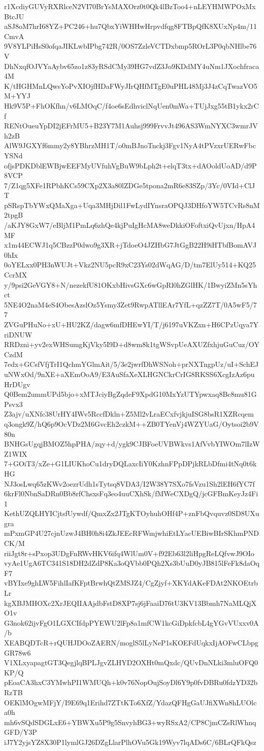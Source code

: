 r1XcdiyGUVyRXRlceN2VI70BrYsMAXOrz0t0Qk4lBzToo4+nLEYHMWPOxMxBtcJU
aSJ8oM7hrI68YZ+PC246+hu7QbxYiWHHwHrpvdfqg8FTBpQfK8XUxNp4m/11CmvA
9V8YLPiHsS0ofqaJIKLwbIPbg742R/0OS7ZzleVCTDxbmp5ROrL3P0qbNHlbe76V
DhNxqfOJVYaAybv65zo1z83yRSdCMy39HG7vdZ3Jo9KDdMY4uNm1JXochfraca4M
K/tHGHMnLQwsYoPvXIOjfHDaFWyJIrQHfMTgE0uPHL48Mj3J4zCqTwazVO5M+YYJ
Hk9V5P+FhOKfhn/v6LMOqC/f4oe6sEdhviclNqUen0mWa+TUjJxg55tB1ykx2rCf
RENtOueuYpDI2jEFrMU5+B23Y7M1Auhsj999FrvvJt496AS3WmNYXC3wmrJVh2zB
AlW9JGXYf6mmy2y8YBhrzMH1T/o0mBJnoTnckj3Fgv1NyA4tPVzxrUERwFbcYSNd
ofjsPDKDblEWBjwEEFMyUVfuhVgBuW9bLph2t+elqT3tx+dAOoldUoAD/d9P8VCP
7/Z1qg5XFe1RPbhKCs59CXp2X3a80lZDGe5tpona2mR6e83SZp/3Yc/0VId+ClJT
pSRspTbYWxQMaXga+Uqa3MHjDil1FwLydIYnsraOPQJ3DHfoYW5TCvRs8nM2tpgB
/aKJY8GxW7/eBljM1PmLq6zhQe4kjPuIgHcMA8weDkkiOFoftxiQvUjxn/HpA4MF
x1m44ECWJ1q5CBzzP0dwo9g3XR+jTdoeO4JZHbG7JtGgB22H9iHTbfBomAVJ0hIx
0oYELxx0PH3nWUJt+Vkz2NU5pcR9xC23Ys02dWqAG/D/tm7ElUy514+KQ25CcrMX
y/9psi2GeVGY8+N/nezekfU81OKxbHivsGXc6wGpRl0hZGlHK/1BwyiZMn5sYhct
5NE4O2naM4eS4ObesAzslOz5Ysmy3Zet9RwpATllEAr7YfL+qzZZ7T/0A5wF5/77
ZVGuPHuNo+xU+HU2KZ/dagw6mfDHEwYI/T/j6197uVKZxn+H6CPzUqya7YriDNUW
RRDzni+yv2exWHSumgKjVky5I9D+d8wm8k1tgWSvpUeAXUZfxhjuGuCuz/OYCzdM
7edx+GCsfVfjTrI1QchmYGlmAit/5/3e2jwrfDhWSNoh+prNXTngpUz/uI+SchEJ
uNWxOd/9nXE+aXEmOoA9/E3AuSfaXeXLHGNCkrCrIG8RKSS6XcgIzAz6puHrDUgv
Q0Bem2ummUPd5bjo+xMTJciyBgZqdeF9XpdG10MxYzUTYpwxaq8Bc8mu81GPsvx3
Z3ajv/uXNfc38UrHY4IWv5RccfDkln+Z5Ml2vLraECxfvjkjuISG8bsR1XZRcqem
q3ongk9Z/hQ6p9OcVDz2M6GvcEh2czkM++ZB0TYenVj4WZYUaG/Oytsoi2b9V80n
BNHGsUgqjBMOZ5hpPHA/zqy+d/ygk9CJBFoeUVBWkvs1AfVvbYIWOm7lIzWZ1WIX
7+GOiT3/xZe+G1LIUKhoCu1dryDQLaxcIiY0KzhnFPpDPjkRLbDfmi4tNq0t6kHG
NJ3osLwq65zKWv2oezrUdh1sTytsq8VDA3/I2W38Y7SXo7fsVzu1Sh2lEH6fYC7f
6krFl0NbnSaDRn0Bb8rfChsxsFq3eo4uuCXhSk/fMWeCXDgQ/jcGFBmKeyJz4Fi1
KethUZQLHYICjtsfUywdf/QmxZx2JTgKTOyhuhOHf4P+znFbQvquvz0SD8UXugra
mPxmGP4U27cjnUzwJ4BH0h8i4ZkJEEcRFWmjwhiEtLYacUEBiwBIrSKhmPNDCK/M
riiJgt8r+sPxop3UDgFnRWvHKV6ifq4WlUm0V+f92Eb63l2liHpgReLQfvwJ9OIo
vyAe1UgA6TC341S18DH2dZdP8Ka3oQVbb0PQh2Xs3bUuD0yJB815lFeFk8daOqF7
vBYIxe9ghLW5FihlIafKFptBrwhQtZMSJZ4/CgZjyf+XKYdAKeFDAt2NKOEtrbLr
kgXBJMHOXc2XrJEQIIAAjdbFstD8XP7sj6jFaaiD76tU3KV13Bbmh7NaMLQjXO1v
G3nok62ijvFgO1LGXCIfdpPYEWU2lFp8a1mfCW1kcGiDpkfcbL4gYGvVUxxv0A/b
XEABQDTcR+rQUHJDOoZAERN/moglS5lLyNeP1sKOEFdUqkxIjAOFwCLbpgGR78w6
V1XLxyapagtGT3QegjlqBPLJgvZLHYD2OXHt0mQxdc/QUvDnNLki3mluOFQ0KP/Q
pEoaCA3hxC3YMwhPI1WMUQh+k0v76NopOujSoyDl6Y9p0fvDBRu0fdzYD32bRzTB
OEKlMOgwMFjY/I9E69q1Erihd7ZTtKTo6XfZ/YdazQFHgGaUJfiXWn8hLUOlca0h
mh6vSQdSDGLxE6+YBWXu5P9g5SnvyhBG3+wyRSxA2/CP8CjmCZsRlWhnqGFD/Y3P
iJ7Y2yjsYZ8X30P1lymlGJ26DZgLlarPlhOVu5Gk19Wyv7lqADs6C/6BLrQFkQsz
